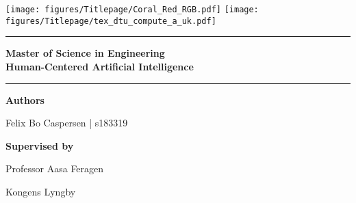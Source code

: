 \begin{titlepage}
    \raggedright
    \texttt{[image: figures/Titlepage/Coral\_Red\_RGB.pdf]}
    \hfill
    \texttt{[image: figures/Titlepage/tex\_dtu\_compute\_a\_uk.pdf]}
    \begin{center}
        \vspace{3 cm}
        \hrule
        \vspace{.3cm}
        { \huge {\bfseries {\opgavetitel}}
        } 
        
        \vspace{.1cm}
        { \LARGE {\bfseries 
            {
                Master of Science in Engineering
                \\
                Human-Centered Artificial Intelligence
            }
        }
        }
        \vspace{.5cm}
        
        \hrule
        \vspace{1.5cm}
        
        \textbf{Authors}\\
        \vspace{.5cm}
        \centering
        
        Felix Bo Caspersen | s183319\\
        
        \vspace{1.5cm}
        
        \textbf{Supervised by}\\
        \vspace{.5cm}
        \centering
        
        Professor Aasa Feragen \\
        \vspace{1.5cm}
        
        Kongens Lyngby \\
        \centering \datoen %
    \end{center}
\end{titlepage}